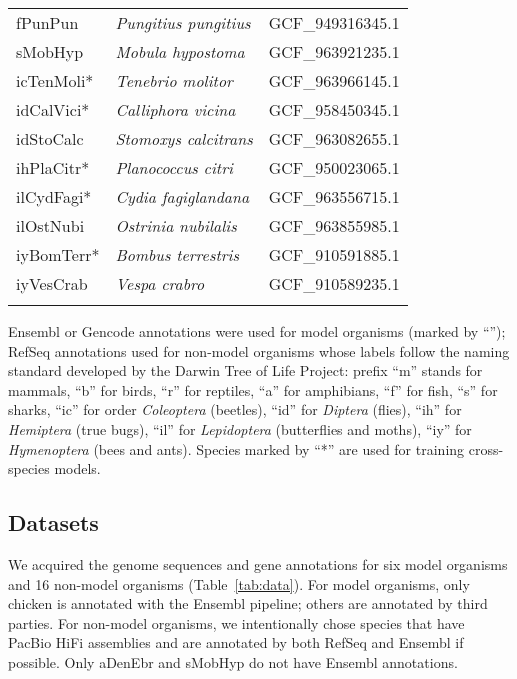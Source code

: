 \documentclass[webpdf,contemporary,large,namedate]{oup-authoring-template}%
\begin{document}
\begin{table}[!tb]
\begin{tabular*}{\columnwidth}{@{\extracolsep\fill}lll@{\extracolsep\fill}}
fPunPun        & \emph{Pungitius pungitius}        & GCF\_949316345.1 \\
sMobHyp        & \emph{Mobula hypostoma}           & GCF\_963921235.1 \\
icTenMoli*     & \emph{Tenebrio molitor}           & GCF\_963966145.1 \\
idCalVici*     & \emph{Calliphora vicina}          & GCF\_958450345.1 \\
idStoCalc      & \emph{Stomoxys calcitrans}        & GCF\_963082655.1 \\
ihPlaCitr*     & \emph{Planococcus citri}          & GCF\_950023065.1 \\
ilCydFagi*     & \emph{Cydia fagiglandana}         & GCF\_963556715.1 \\
ilOstNubi      & \emph{Ostrinia nubilalis}         & GCF\_963855985.1 \\
iyBomTerr*     & \emph{Bombus terrestris}          & GCF\_910591885.1 \\
iyVesCrab      & \emph{Vespa crabro}               & GCF\_910589235.1 \\
\botrule
\end{tabular*}
\begin{tablenotes}\setlength\itemsep{0.0em}
Ensembl or Gencode annotations were used for model organisms (marked by ``\dag'');
RefSeq annotations used for non-model organisms whose labels
follow the naming standard developed by the Darwin Tree of Life Project:
prefix ``m'' stands for mammals,
``b'' for birds,
``r'' for reptiles,
``a'' for amphibians,
``f'' for fish,
``s'' for sharks,
``ic'' for order \emph{Coleoptera} (beetles),
``id'' for \emph{Diptera} (flies),
``ih'' for \emph{Hemiptera} (true bugs),
``il'' for \emph{Lepidoptera} (butterflies and moths),
``iy'' for \emph{Hymenoptera} (bees and ants).
Species marked by ``*'' are used for training cross-species models.
\end{tablenotes}
\end{table}

\subsection{Datasets}

We acquired the genome sequences and gene annotations for six model organisms and 16 non-model organisms (Table~\ref{tab:data}).
For model organisms, only chicken is annotated with the Ensembl pipeline;
others are annotated by third parties.
For non-model organisms, we intentionally chose species that have PacBio HiFi assemblies
and are annotated by both RefSeq and Ensembl if possible.
Only aDenEbr and sMobHyp do not have Ensembl annotations.
\end{document}
